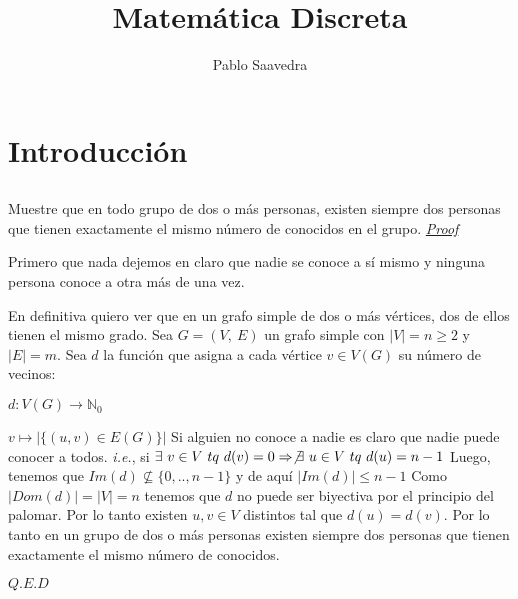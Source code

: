 \documentclass{article}
\begin{document}
\author{Pablo Saavedra}
\title{Matemática Discreta}
\section{Introducción}
\subsection{}

Muestre que en todo grupo de dos o más personas, existen siempre dos
personas que tienen exactamente el mismo número de conocidos en el grupo.
\newline\newline
\underline{\textit{Proof}}
\newline

Primero que nada dejemos en claro que nadie se conoce a sí mismo y ninguna persona conoce a otra más de una vez.

En definitiva quiero ver que en un grafo simple de dos o más vértices, dos de ellos tienen el mismo grado.
\newline\newline
Sea $G=(V,\ E)$ un grafo simple con $|V| = n \geq 2$ y $|E| = m$.
\newline\newline
Sea $d$ la función que asigna a cada vértice $v \in V(G)$ su número de vecinos:
\newline

\hspace{1cm}$d: V(G) \rightarrow \mathbb{N}_{0}$

\hspace{1cm}$v \mapsto |\{ (u, v) \in E(G) \}|$
\newline\newline
Si alguien no conoce a nadie es claro que nadie puede conocer a todos.
\textit{i.e.}, si $\exists\ v \in V\ tq\ d(v) = 0 \Rightarrow \not \exists\ u \in V\ tq\ d(u) = n - 1$
\newline
Luego, tenemos que $Im(d) \not \subseteq \{0, .., n - 1\}$ y de aquí $|Im(d)| \leq n - 1$
\newline
Como $|Dom(d)| = |V| = n$ tenemos que $d$ no puede ser biyectiva por el principio del palomar.
\newline
Por lo tanto existen $u, v \in V$ distintos tal que $d(u) = d(v)$.
\newline
Por lo tanto en un grupo de dos o más personas existen siempre dos personas que tienen
exactamente el mismo número de conocidos.

\hspace{9cm}$Q.E.D$
\end{document}
